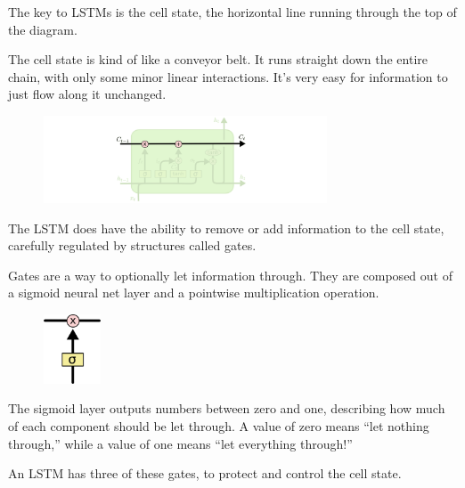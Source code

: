 The key to LSTMs is the cell state, the horizontal line running through the top of the diagram.

The cell state is kind of like a conveyor belt. It runs straight down the entire chain, with only some minor linear interactions. It’s very easy for information to just flow along it unchanged.

\begin{figure}[h]
	\centering
	\includegraphics[width=0.75\textwidth]{fig/7.png}
\end{figure}

The LSTM does have the ability to remove or add information to the cell state, carefully regulated by structures called gates.

Gates are a way to optionally let information through. They are composed out of a sigmoid neural net layer and a pointwise multiplication operation.

\begin{figure}[h]
	\centering
	\includegraphics[width=0.15\textwidth]{fig/8.png}
\end{figure}

The sigmoid layer outputs numbers between zero and one, describing how much of each component should be let through. A value of zero means “let nothing through,” while a value of one means “let everything through!”

An LSTM has three of these gates, to protect and control the cell state.
